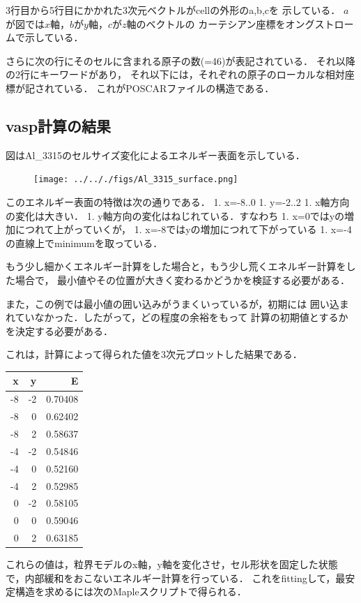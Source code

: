 3行目から5行目にかかれた3次元ベクトルがcellの外形のa,b,cを 示している．
\(a\)が図では\(x\)軸，\(b\)が\(y\)軸，\(c\)が\(z\)軸のベクトルの
カーテシアン座標をオングストロームで示している．

さらに次の行にそのセルに含まれる原子の数(=46)が表記されている．
それ以降の2行にキーワードがあり，
それ以下には，それぞれの原子のローカルな相対座標が記されている．
これがPOSCARファイルの構造である．

    \subsection{vasp計算の結果}\label{vaspux8a08ux7b97ux306eux7d50ux679c}

    図はAl\_3315のセルサイズ変化によるエネルギー表面を示している．

\begin{figure}[H]
\centering
\begin{center}
\texttt{[image: ../.././figs/Al\_3315\_surface.png]}
\end{center}
\caption{{}}

\label{fig:}
\end{figure}

    このエネルギー表面の特徴は次の通りである． 1. x=-8..0 1. y=-2..2 1.
x軸方向の変化は大きい． 1. y軸方向の変化はねじれている．すなわち 1.
x=0ではyの増加につれて上がっていくが， 1.
x=-8ではyの増加につれて下がっている 1.
x=-4の直線上でminimumを取っている．

もう少し細かくエネルギー計算をした場合と，もう少し荒くエネルギー計算をした場合で，
最小値やその位置が大きく変わるかどうかを検証する必要がある．

また，この例では最小値の囲い込みがうまくいっているが，初期には
囲い込まれていなかった．したがって，どの程度の余裕をもって
計算の初期値とするかを決定する必要がある．

    これは，計算によって得られた値を3次元プロットした結果である．

\begin{longtable}[]{@{}rrr@{}}
\toprule
x & y & E\tabularnewline
\midrule
\endhead
-8 & -2 & 0.70408\tabularnewline
-8 & 0 & 0.62402\tabularnewline
-8 & 2 & 0.58637\tabularnewline
-4 & -2 & 0.54846\tabularnewline
-4 & 0 & 0.52160\tabularnewline
-4 & 2 & 0.52985\tabularnewline
0 & -2 & 0.58105\tabularnewline
0 & 0 & 0.59046\tabularnewline
0 & 2 & 0.63185\tabularnewline
\bottomrule
\end{longtable}

これらの値は，粒界モデルのx軸，y軸を変化させ，セル形状を固定した状態で，内部緩和をおこないエネルギー計算を行っている．
これをfittingして，最安定構造を求めるには次のMapleスクリプトで得られる．

